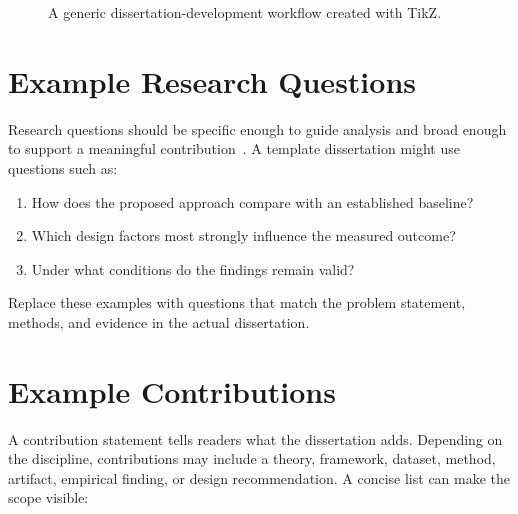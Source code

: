 \begin{figure}[ht]
    \centering
    \caption{A generic dissertation-development workflow created with TikZ.}
    \label{fig:thesis-workflow}
\end{figure}

\section{Example Research Questions}

Research questions should be specific enough to guide analysis and broad enough to support a meaningful contribution~\cite{booth2016craft}. A template dissertation might use questions such as:

\begin{enumerate}
    \item How does the proposed approach compare with an established baseline?
    \item Which design factors most strongly influence the measured outcome?
    \item Under what conditions do the findings remain valid?
\end{enumerate}

Replace these examples with questions that match the problem statement, methods, and evidence in the actual dissertation.

\section{Example Contributions}

A contribution statement tells readers what the dissertation adds. Depending on the discipline, contributions may include a theory, framework, dataset, method, artifact, empirical finding, or design recommendation. A concise list can make the scope visible:

